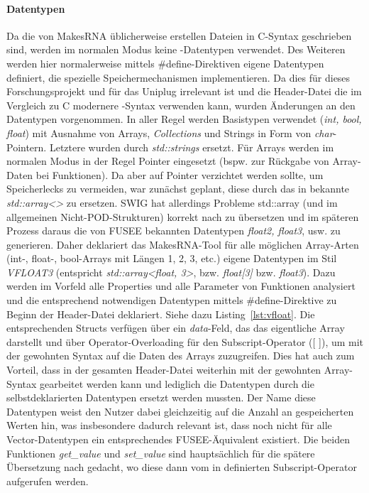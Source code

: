\paragraph{Datentypen}

Da die von MakesRNA üblicherweise erstellen Dateien in C-Syntax geschrieben sind, werden im normalen Modus keine \CC-Datentypen verwendet. Des Weiteren werden hier normalerweise mittels \#define-Direktiven eigene Datentypen definiert, die spezielle Speichermechanismen implementieren. Da dies für dieses Forschungsprojekt und für das Uniplug irrelevant ist und die Header-Datei die im Vergleich zu C modernere \CC-Syntax verwenden kann, wurden Änderungen an den Datentypen vorgenommen. In aller Regel werden Basistypen verwendet (\emph{int, bool, float}) mit Ausnahme von Arrays, \emph{Collections} und Strings in Form von \emph{char}-Pointern. Letztere wurden durch \emph{std::strings} ersetzt. Für Arrays werden im normalen Modus in der Regel Pointer eingesetzt (bspw. zur Rückgabe von Array-Daten bei Funktionen). Da aber auf Pointer verzichtet werden sollte, um Speicherlecks zu vermeiden, war zunächst geplant, diese durch das in \CC{} bekannte \emph{std::array<>} zu ersetzen. SWIG hat allerdings Probleme std::array (und im allgemeinen Nicht-POD-Strukturen) korrekt nach \CS{} zu übersetzen und im späteren Prozess daraus die von FUSEE bekannten Datentypen \emph{float2, float3}, usw. zu generieren. Daher deklariert das MakesRNA-Tool für alle möglichen Array-Arten (int-, float-, bool-Arrays mit Längen 1, 2, 3, etc.) eigene Datentypen im Stil \emph{VFLOAT3} (entspricht \emph{std::array<float, 3>}, bzw. \emph{float[3]} bzw. \emph{float3}). Dazu werden im Vorfeld alle Properties und alle Parameter von Funktionen analysiert und die entsprechend notwendigen Datentypen mittels \#define-Direktive zu Beginn der Header-Datei deklariert. Siehe dazu Listing~\ref{lst:vfloat}. Die entsprechenden Structs verfügen über ein \emph{data}-Feld, das das eigentliche Array darstellt und über Operator-Overloading für den Subscript-Operator ([ ]), um mit der gewohnten Syntax auf die Daten des Arrays zuzugreifen. Dies hat auch zum Vorteil, dass in der gesamten Header-Datei weiterhin mit der gewohnten Array-Syntax gearbeitet werden kann und lediglich die Datentypen durch die selbstdeklarierten Datentypen ersetzt werden mussten. Der Name diese Datentypen weist den Nutzer dabei gleichzeitig auf die Anzahl an gespeicherten Werten hin, was insbesondere dadurch relevant ist, dass noch nicht für alle Vector-Datentypen ein entsprechendes FUSEE-Äquivalent existiert. Die beiden Funktionen \emph{get\_value} und \emph{set\_value} sind hauptsächlich für die spätere Übersetzung nach \CS{} gedacht, wo diese dann vom in \CS{} definierten Subscript-Operator aufgerufen werden.

